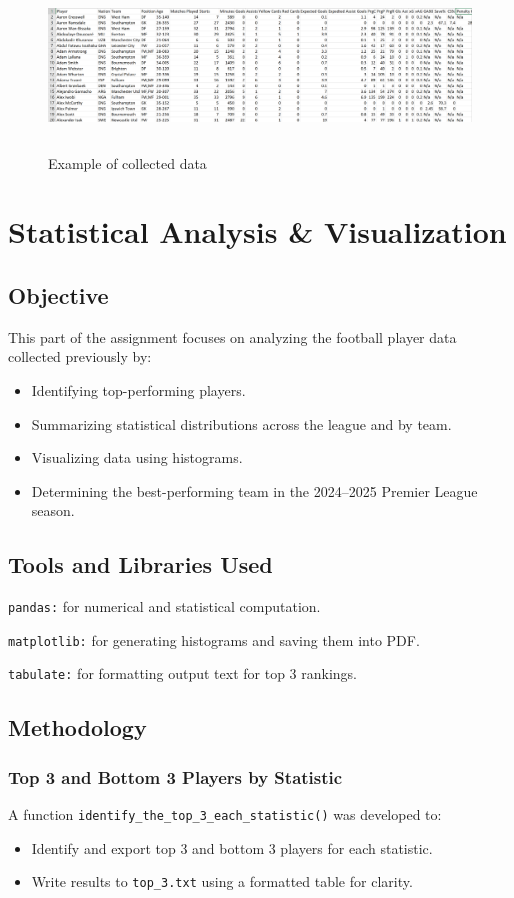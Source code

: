 \documentclass[12pt,a4paper]{report}
\begin{document}
\begin{figure}[H]
    \centering
    \includegraphics[width=6.5in,height=1.75in]{media/image10.png}
    \caption{Example of collected data}
\end{figure}

\chapter{Statistical Analysis \& Visualization}
\section{Objective}
This part of the assignment focuses on analyzing the football player data collected previously by:
\begin{itemize}
    \item Identifying top-performing players.
    \item Summarizing statistical distributions across the league and by team.
    \item Visualizing data using histograms.
    \item Determining the best-performing team in the 2024--2025 Premier League season.
\end{itemize}

\section{Tools and Libraries Used}
   \texttt{pandas:} for numerical and statistical computation.

   \texttt{matplotlib:} for generating histograms and saving them into PDF.
   
   \texttt{tabulate:} for formatting output text for top 3 rankings.

\section{Methodology}
\subsection{Top 3 and Bottom 3 Players by Statistic}
A function \texttt{identify\_the\_top\_3\_each\_statistic()} was developed to:
\begin{itemize}
    \item Identify and export top 3 and bottom 3 players for each statistic.
    \item Write results to \texttt{top\_3.txt} using a formatted table for clarity.
\end{itemize}
\end{document}
